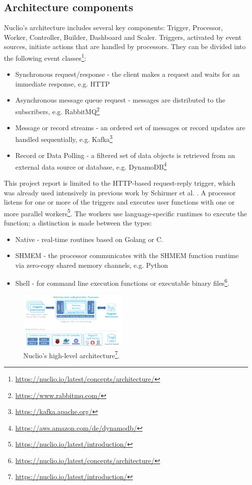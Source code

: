 \subsection{Architecture components}
\label{sec:nuclio-components}
Nuclio's architecture includes several key components: Trigger, Processor, Worker, Controller, Builder, Dashboard and Scaler. Triggers, activated by event sources, initiate actions that are handled by processors. They can be divided into the following event classes\footnote{\url{https://nuclio.io/latest/concepts/architecture/}}:
\begin{itemize}
    \item Synchronous request/response - the client makes a request and waits for an immediate response, e.g. HTTP
    \item Asynchronous message queue request - messages are distributed to the subscribers, e.g. RabbitMQ\footnote{\url{https://www.rabbitmq.com/}}
    \item Message or record streams - an ordered set of messages or record updates are handled sequentially, e.g.  Kafka\footnote{\url{https://kafka.apache.org/}}
    \item Record or Data Polling - a filtered set of data objects is retrieved from an external data source or database, e.g.  DynamoDB\footnote{\url{https://aws.amazon.com/de/dynamodb/}}
\end{itemize} 
This project report is limited to the HTTP-based request-reply trigger, which was already used intensively in previous work by Schirmer et al. \cite{schirmer2023profaastinate}.
A processor listens for one or more of the triggers and executes user functions with one or more parallel workers\footnote{\url{https://nuclio.io/latest/introduction/}}. 
The workers use language-specific runtimes to execute the function; a distinction is made between the types:
\begin{itemize}
    \item Native - real-time routines based on Golang or C.
    \item SHMEM - the processor communicates with the SHMEM function runtime via zero-copy shared memory channels, e.g. Python
    \item Shell - for command line execution functions or executable binary files\footnote{\url{https://nuclio.io/latest/concepts/architecture/}}.
\end{itemize}
\vspace{5mm} 
\begin{figure}
    \centering
    \includegraphics[width=0.48\textwidth]{figures/profaastinate/nuclio-architecture.png} %
    \caption{
         Nuclio's high-level architecture\protect\footnote{\url{https://nuclio.io/latest/introduction/}}.
    }
    \label{fig:nuclio-architecture}
\end{figure}

